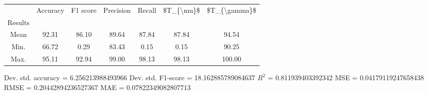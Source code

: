 \begin{tabular}{|c|c|c|c|c|c|c|}
\toprule
{} &  Accuracy &  F1 score &  Precision &  Recall &  \$T\_\{\textbackslash mu\}\$ &  \$T\_\{\textbackslash gamma\}\$ \\
Results &           &           &            &         &            &               \\
\hline
Mean    &     92.31 &     86.10 &      89.64 &   87.84 &      87.84 &         94.54 \\
Min.    &     66.72 &      0.29 &      83.43 &    0.15 &       0.15 &         90.25 \\
Max.    &     95.11 &     92.94 &      99.00 &   98.13 &      98.13 &        100.00 \\
\bottomrule
\end{tabular}

 Dev. std. accuracy = 6.256213988493966
 Dev. std. F1-score = 18.162885789084637
 $R^2$ = 0.811939403392342
 MSE = 0.04179119247658438
 RMSE = 0.20442894236527367
 MAE = 0.07822349082807713